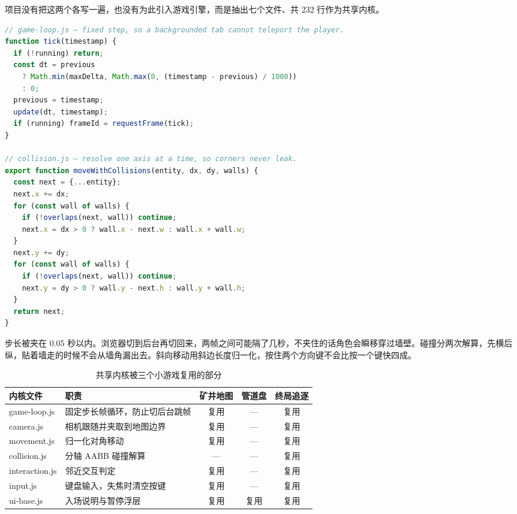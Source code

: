 项目没有把这两个各写一遍，也没有为此引入游戏引擎，而是抽出七个文件、共 232 行作为共享内核。

\begin{lstlisting}[language=JavaScript, caption={共享内核的两个片段}, label={lst:shared-2d}]
// game-loop.js — fixed step, so a backgrounded tab cannot teleport the player.
function tick(timestamp) {
  if (!running) return;
  const dt = previous
    ? Math.min(maxDelta, Math.max(0, (timestamp - previous) / 1000))
    : 0;
  previous = timestamp;
  update(dt, timestamp);
  if (running) frameId = requestFrame(tick);
}

// collision.js — resolve one axis at a time, so corners never leak.
export function moveWithCollisions(entity, dx, dy, walls) {
  const next = {...entity};
  next.x += dx;
  for (const wall of walls) {
    if (!overlaps(next, wall)) continue;
    next.x = dx > 0 ? wall.x - next.w : wall.x + wall.w;
  }
  next.y += dy;
  for (const wall of walls) {
    if (!overlaps(next, wall)) continue;
    next.y = dy > 0 ? wall.y - next.h : wall.y + wall.h;
  }
  return next;
}
\end{lstlisting}

步长被夹在 0.05 秒以内。浏览器切到后台再切回来，两帧之间可能隔了几秒，不夹住的话角色会瞬移穿过墙壁。碰撞分两次解算，先横后纵，贴着墙走的时候不会从墙角漏出去。斜向移动用斜边长度归一化，按住两个方向键不会比按一个键快四成。

\begin{table}[htbp]
\centering
\caption{共享内核被三个小游戏复用的部分}
\label{tab:shared-2d}
\small
\begin{tabularx}{\linewidth}{@{}l l c c c@{}}
\toprule
内核文件 & 职责 & 矿井地图 & 管道盘 & 终局追逐 \\
\midrule
game-loop.js  & 固定步长帧循环，防止切后台跳帧 & 复用 & — & 复用 \\
camera.js     & 相机跟随并夹取到地图边界     & 复用 & — & 复用 \\
movement.js   & 归一化对角移动               & 复用 & — & 复用 \\
collision.js  & 分轴 AABB 碰撞解算           & — & — & 复用 \\
interaction.js & 邻近交互判定                & 复用 & — & 复用 \\
input.js      & 键盘输入，失焦时清空按键      & 复用 & — & 复用 \\
ui-base.js    & 入场说明与暂停浮层           & 复用 & 复用 & 复用 \\
\bottomrule
\end{tabularx}
\end{table}

